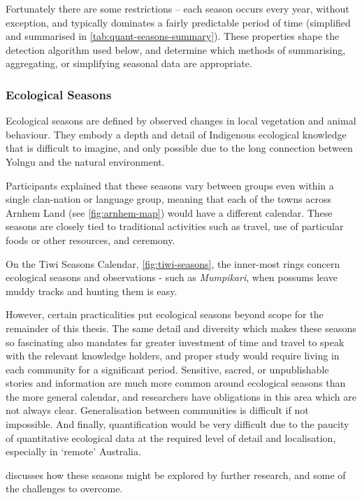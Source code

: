 Fortunately there are some restrictions -- each season occurs every year,
without exception, and typically dominates a fairly predictable period
of time (simplified and summarised in \cref{tab:quant-seasons-summary}).
These properties shape the detection algorithm used below, and determine
which methods of summarising, aggregating, or simplifying seasonal data
are appropriate.



\subsubsection{Ecological Seasons}
Ecological seasons are defined by observed changes in local vegetation
and animal behaviour.  They embody a depth and detail of Indigenous
ecological knowledge that is difficult to imagine, and only possible
due to the long connection between Yolngu and the natural environment.

Participants explained that these seasons vary between groups even within
a single clan-nation or language group, meaning that each of the towns
across Arnhem Land (see \cref{fig:arnhem-map}) would have a different
calendar. These seasons are closely tied to traditional activities such as
travel, use of particular foods or other resources, and ceremony.

On the Tiwi Seasons Calendar, \cref{fig:tiwi-seasons}, the inner-most
rings concern ecological seasons and observations - such as
\textit{Mumpikari}, when possums leave muddy tracks and hunting them is easy.

However, certain practicalities put ecological seasons beyond scope
for the remainder of this thesis.
The same detail and diversity which makes these seasons so fascinating
also mandates far greater investment of time and travel to speak
with the relevant knowledge holders, and proper study would require
living in each community for a significant period.
Sensitive, sacred, or unpublishable stories and information are much more
common around ecological seasons than the more general calendar,
and researchers have obligations in this area which are not always clear.
Generalisation between communities is difficult if not impossible.
And finally, quantification would be very difficult due to the paucity
of quantitative ecological data at the required level of detail
and localisation, especially in `remote' Australia.

 discusses how these seasons might be explored
by further research, and some of the challenges to overcome.



